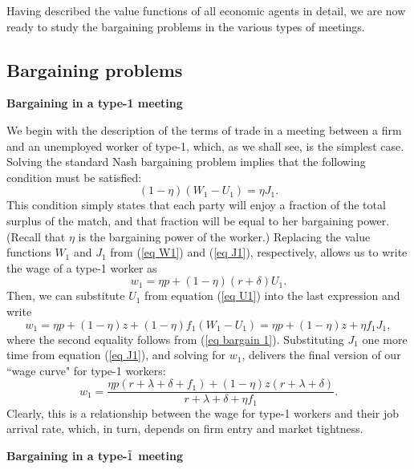 \documentclass[12pt]{article} %
\theoremstyle{definition}
\begin{document}
Having described the value functions of all economic agents in detail, we are now ready to study the bargaining problems in the various types of meetings. 


\subsection{Bargaining problems}\label{section bargaining} 

\textbf{Bargaining in a type-1 meeting}

\medskip 

\noindent We begin with the description of the terms of trade in a meeting between a firm and an unemployed worker of type-1, which, as we shall see, is the simplest case. Solving the standard Nash bargaining problem implies that the following condition must be satisfied:
\begin{equation}
(1-\eta)(W_1-U_1) = \eta J_1. \label{eq bargain 1}
\end{equation}
This condition simply states that each party will enjoy a fraction of the total surplus of the match, and that fraction will be equal to her bargaining power. (Recall that $\eta$ is the bargaining power of the worker.) Replacing the value functions $W_1$ and $J_1$ from (\ref{eq W1}) and (\ref{eq J1}), respectively, allows us to write the wage of a type-1 worker as 
$$
w_1 = \eta p + (1-\eta)(r+\delta)U_1. 
$$Then, we can substitute $U_1$ from equation (\ref{eq U1}) into the last expression and write 
$$
w_1= \eta p + (1-\eta)z + (1-\eta)f_1(W_1-U_1)=  \eta p + (1-\eta)z + \eta f_1 J_1, 
$$where the second equality follows from (\ref{eq bargain 1}). Substituting $J_1$ one more time from equation (\ref{eq J1}), and solving for $w_1$, delivers the final version of our ``wage curve" for type-1 workers:  
\begin{equation}
 w_1 = \frac{\eta p (r+\lambda+\delta+f_1)+(1-\eta)z(r+\lambda+\delta)}{r+\lambda+\delta + \eta f_1}. \label{eq WC 1}
\end{equation}Clearly, this is a relationship between the wage for type-1 workers and their job arrival rate, which, in turn, depends on firm entry and market tightness. 

\bigskip 


\noindent \textbf{Bargaining in a type-$\Tilde{1}$ meeting}

\medskip 
\end{document}
